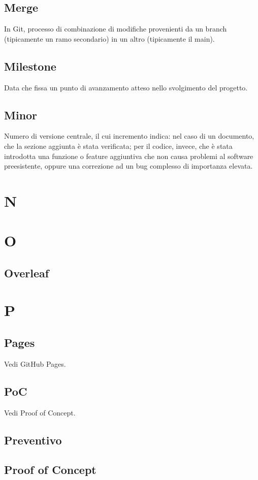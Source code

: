     \subsection{Merge}
    In Git, processo di combinazione di modifiche provenienti da un branch (tipicamente 
    un ramo secondario) in un altro (tipicamente il main).
    \subsection{Milestone}
    Data che fissa un punto di avanzamento atteso nello svolgimento del progetto.
    \subsection{Minor}
    Numero di versione centrale, il cui incremento indica: nel caso di un documento, che la sezione aggiunta è stata verificata; per il codice, invece, che è stata
    introdotta una funzione o feature aggiuntiva che non causa problemi al software preesistente, oppure una correzione ad un bug complesso di importanza elevata.

\section{N}
\section{O}
    \subsection{Overleaf}
\section{P}
    \subsection{Pages}
    Vedi GitHub Pages.
    \subsection{PoC}
    Vedi Proof of Concept.
    \subsection{Preventivo}
    \subsection{Proof of Concept}
